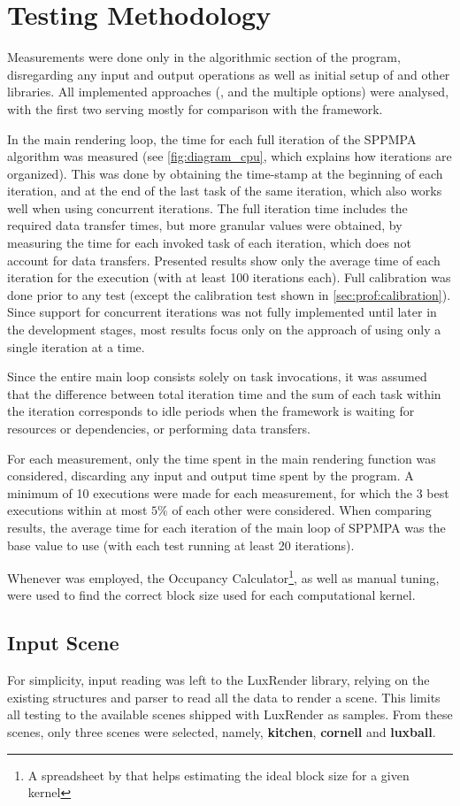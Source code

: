 \documentclass[main.tex]{subfiles}
\begin{document}
\section{Testing Methodology} \label{sec:results:method}

Measurements were done only in the algorithmic section of the program, disregarding any input and output operations as well as initial setup of \starpu and other libraries. All implemented approaches (\cpu, \gpu and the multiple \starpu options) were analysed, with the first two serving mostly for comparison with the framework.

In the main rendering loop, the time for each full iteration of the SPPMPA algorithm was measured (see \cref{fig:diagram_cpu}, which explains how iterations are organized). This was done by obtaining the time-stamp at the beginning of each iteration, and at the end of the last task of the same iteration, which also works well when using concurrent iterations. The full iteration time includes the required data transfer times, but more granular values were obtained, by measuring the time for each invoked task of each iteration, which does not account for data transfers. Presented results show only the average time of each iteration for the execution (with at least 100 iterations each). Full calibration was done prior to any \starpu test (except the calibration test shown in \cref{sec:prof:calibration}).
Since support for concurrent iterations was not fully implemented until later in the development stages, most results focus only on the approach of using only a single iteration at a time.

Since the entire main loop consists solely on task invocations, it was assumed that the difference between total iteration time and the sum of each task within the iteration corresponds to idle periods when the framework is waiting for resources or dependencies, or performing data transfers.

For each measurement, only the time spent in the main rendering function was considered, discarding any input and output time spent by the program. A minimum of 10 executions were made for each measurement, for which the 3 best executions within at most $5\%$ of each other were considered. When comparing results, the average time for each iteration of the main loop of SPPMPA was the base value to use (with each test running at least 20 iterations).

Whenever \cuda was employed, the \cuda Occupancy Calculator\footnote{A spreadsheet by \nvidia that helps estimating the ideal block size for a given kernel}, as well as manual tuning, were used to find the correct block size used for each computational kernel.

\subsection{Input Scene}

For simplicity, input reading was left to the LuxRender library, relying on the existing structures and parser to read all the data to render a scene. This limits all testing to the available scenes shipped with LuxRender as samples. From these scenes, only three scenes were selected, namely, \textbf{kitchen}, \textbf{cornell} and \textbf{luxball}.
\end{document}
